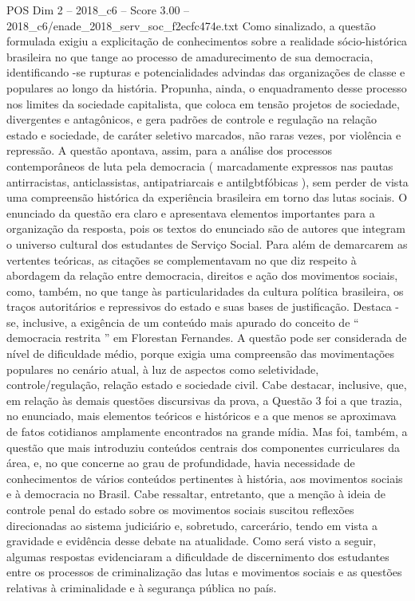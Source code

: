 \begin{textsample}{POS Dim 2 – 2018\_c6 – Score 3.00 – 2018\_c6/enade\_2018\_serv\_soc\_f2ecfc474e.txt}
Como sinalizado, a questão formulada exigiu a explicitação de conhecimentos sobre a realidade sócio-histórica brasileira no que tange ao processo de amadurecimento de sua democracia, identificando -se rupturas e potencialidades advindas das organizações de classe e populares ao longo da história.
Propunha, ainda, o enquadramento desse processo nos limites da sociedade capitalista, que coloca em tensão projetos de sociedade, divergentes e antagônicos, e gera padrões de controle e regulação na relação estado e sociedade, de caráter seletivo marcados, não raras vezes, por violência e repressão.
A questão apontava, assim, para a análise dos processos contemporâneos de luta pela democracia ( marcadamente expressos nas pautas antirracistas, anticlassistas, antipatriarcais e antilgbtfóbicas ), sem perder de vista uma compreensão histórica da experiência brasileira em torno das lutas sociais.
O enunciado da questão era claro e apresentava elementos importantes para a organização da resposta, pois os textos do enunciado são de autores que integram o universo cultural dos estudantes de Serviço Social.
Para além de demarcarem as vertentes teóricas, as citações se complementavam no que diz respeito à abordagem da relação entre democracia, direitos e ação dos movimentos sociais, como, também, no que tange às particularidades da cultura política brasileira, os traços autoritários e repressivos do estado e suas bases de justificação.
Destaca -se, inclusive, a exigência de um conteúdo mais apurado do conceito de “ democracia restrita ” em Florestan Fernandes.
A questão pode ser considerada de nível de dificuldade médio, porque exigia uma compreensão das movimentações populares no cenário atual, à luz de aspectos como seletividade, controle/regulação, relação estado e sociedade civil.
Cabe destacar, inclusive, que, em relação às demais questões discursivas da prova, a Questão 3 foi a que trazia, no enunciado, mais elementos teóricos e históricos e a que menos se aproximava de fatos cotidianos amplamente encontrados na grande mídia.
Mas foi, também, a questão que mais introduziu conteúdos centrais dos componentes curriculares da área, e, no que concerne ao grau de profundidade, havia necessidade de conhecimentos de vários conteúdos pertinentes à história, aos movimentos sociais e à democracia no Brasil.
Cabe ressaltar, entretanto, que a menção à ideia de controle penal do estado sobre os movimentos sociais suscitou reflexões direcionadas ao sistema judiciário e, sobretudo, carcerário, tendo em vista a gravidade e evidência desse debate na atualidade.
Como será visto a seguir, algumas respostas evidenciaram a dificuldade de discernimento dos estudantes entre os processos de criminalização das lutas e movimentos sociais e as questões relativas à criminalidade e à segurança pública no país.

\end{textsample}
